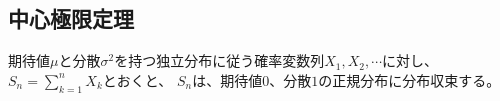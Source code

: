 \subsection{中心極限定理}
\begin{theo}[中心極限定理]
    期待値$\mu$と分散$\sigma^2$を持つ独立分布に従う確率変数列$X_1,X_2,\cdots$に対し、$S_n=\sum_{k=1}^nX_k$とおくと、
    $S_n$は、期待値$0$、分散$1$の正規分布に分布収束する。
\end{theo}

